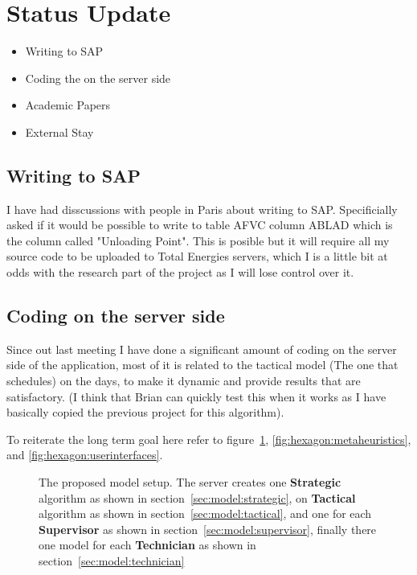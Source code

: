 \section{Status Update}

\begin{itemize}
	\item Writing to SAP
	\item Coding the on the server side
	\item Academic Papers
	\item External Stay
\end{itemize}

\subsection{Writing to SAP}
I have had disscussions with people in Paris about writing to SAP. Specificially 
asked if it would be possible to write to table AFVC column ABLAD which is the 
column called "Unloading Point". This is posible but it will require all
my source code to be uploaded to Total Energies servers, which I is a little 
bit at odds with the research part of the project as I will lose control over it.

\subsection{Coding on the server side}
Since out last meeting I have done a significant amount of coding on the server side
of the application, most of it is related to the tactical model (The one that schedules)
on the days, to make it dynamic and provide results that are satisfactory. (I think that
Brian can quickly test this when it works as I have basically copied the previous project
for this algorithm).

To reiterate the long term goal here refer to figure~\ref{fig:hexagon:persistence}, \ref{fig:hexagon:metaheuristics}, and \ref{fig:hexagon:userinterfaces}. 

	
\begin{figure}[H]
	\centering
    \drawModelSetupHexagon[userinterface=false, persistence=true, metaheuristics=false]
	\caption{The proposed model setup. The server creates one \textbf{Strategic} algorithm as shown in section~\ref{sec:model:strategic}, 
	on \textbf{Tactical} algorithm as shown in section~\ref{sec:model:tactical}, and 
	one for each \textbf{Supervisor} as shown in section~\ref{sec:model:supervisor}, 
	finally there one model for each \textbf{Technician} as shown in section~\ref{sec:model:technician}}
	\label{fig:hexagon:persistence}
\end{figure}

